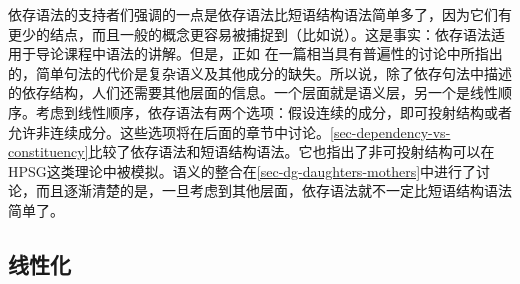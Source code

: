 依存语法的支持者们强调的一点是依存语法比短语结构语法简单多了，因为它们有更少的结点，而且一般的概念更容易被捕捉到（比如说\citet[\S~3.2, \S~7]{Osborne2014a-u}）。这是事实：依存语法适用于导论课程中语法的讲解。但是，正如 \citet[]{SR2012a}在一篇相当具有普遍性的讨论中所指出的，简单句法的代价是复杂语义及其他成分的缺失。所以说，除了依存句法中描述的依存结构，人们还需要其他层面的信息。一个层面就是语义层，另一个是线性顺序。考虑到线性顺序，依存语法有两个选项：假设连续的成分，即可投射结构或者允许非连续成分。这些选项将在后面的章节中讨论。\ref{sec-dependency-vs-constituency}比较了依存语法和短语结构语法。它也指出了非可投射结构可以在HPSG这类理论中被模拟。语义的整合在\ref{sec-dg-daughters-mothers}中进行了讨论，而且逐渐清楚的是，一旦考虑到其他层面，依存语法就不一定比短语结构语法简单了。

\subsection{线性化}
\label{sec-linearization-problems-dg}
\label{sec-dg-multiple-frontings}

